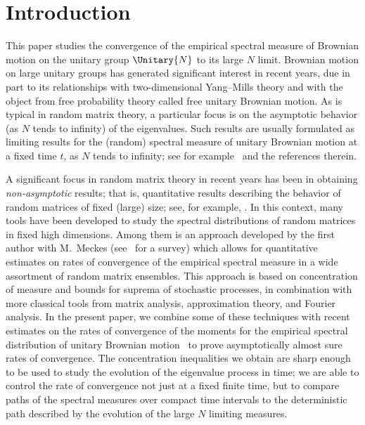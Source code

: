 \section{Introduction}

This paper studies the convergence of the empirical spectral measure of Brownian motion on the unitary group $\Unitary{N}$ to its large $N$ limit. Brownian motion on large unitary groups has generated significant interest in recent years, due in part to its relationships with two-dimensional Yang--Mills theory and with the object from free probability theory called free unitary Brownian motion. As is typical in random matrix theory, a particular focus is on the asymptotic behavior (as $N$ tends to infinity) of the eigenvalues. Such results are usually formulated as limiting results for the (random) spectral measure of unitary Brownian motion at a fixed time $t$, as $N$ tends to infinity; see for example~\cite{Rains1997, Xu1997,Biane1997,Biane1997-2, Levy2008,LevyMaida2010,DHK2013, Kemp2015,CDK2016} and the references therein.

A significant focus in random matrix theory in recent years has been in obtaining
\emph{non-asymptotic} results; that is, quantitative results describing the behavior of random matrices of fixed (large) size; see, for example, \cite{RudVer10}. In this context, many tools have been developed to study the spectral distributions of random matrices in fixed high dimensions. Among them is an approach developed by the first author with M.~Meckes (see~\cite{MM2016} for a survey) which allows for quantitative estimates on rates of convergence of the empirical spectral measure in a wide assortment of random matrix ensembles. This approach is based on concentration of measure and bounds for suprema of stochastic processes, in combination with more classical tools from matrix analysis, approximation theory, and Fourier analysis. In the present paper, we combine some of these techniques with recent estimates on the rates of convergence of the moments for the empirical spectral distribution of unitary Brownian motion~\cite{CDK2016} to prove asymptotically almost sure rates of convergence. The concentration inequalities we obtain are sharp enough to be used to study the evolution of the eigenvalue process in time; we are able to control the rate of convergence not just at a fixed finite time, but to compare paths of the spectral measures over compact time intervals to the deterministic path described by the evolution of the large $N$ limiting measures.


